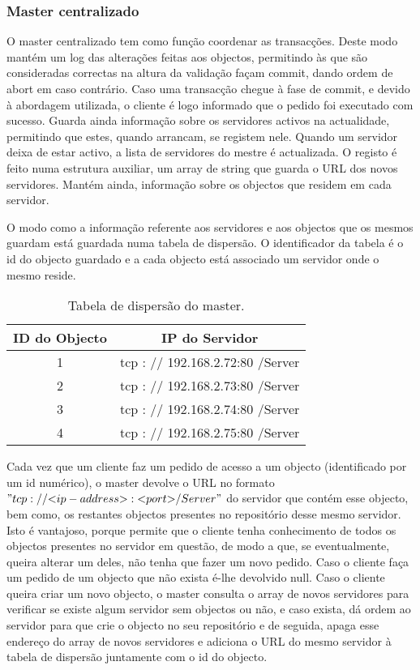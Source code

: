 \subsubsection{Master centralizado}

O master centralizado tem como função coordenar as transacções. Deste modo mantém um log das alterações feitas aos objectos, permitindo às que são consideradas correctas na altura da validação façam commit, dando ordem de abort em caso contrário. Caso uma transacção chegue à fase de commit, e devido à abordagem utilizada, o cliente é logo informado que o pedido foi executado com sucesso. Guarda ainda informação sobre os servidores activos na actualidade, permitindo que estes, quando arrancam, se registem nele. Quando um servidor deixa de estar activo, a lista de servidores do mestre é actualizada. O registo é feito numa estrutura auxiliar, um array de string que guarda o URL dos novos servidores. Mantém ainda, informação sobre os objectos que residem em cada servidor.

O modo como a informação referente aos servidores e aos objectos que os mesmos guardam está guardada numa tabela de dispersão. O identificador da tabela é o id do objecto guardado e a cada objecto está associado um servidor onde o mesmo reside.

\begin{table}
\centering
\begin{tabular}{c|c}
ID do Objecto & IP do Servidor \\\hline
1 & tcp : // 192.168.2.72:80 /Server \\
2 & tcp : // 192.168.2.73:80 /Server \\
3 & tcp : // 192.168.2.74:80 /Server \\
4 & tcp : // 192.168.2.75:80 /Server \\
\end{tabular}
\caption{\label{tab:widgets}Tabela de dispersão do master.}
\end{table}



Cada vez que um cliente faz um pedido de acesso a um objecto (identificado por um id numérico), o master devolve o URL no formato \("tcp : // {<}{ip-address}{>}:{<}{port}{>} /Server"\) do servidor que contém esse objecto, bem como, os restantes objectos presentes no repositório desse mesmo servidor.  Isto é vantajoso, porque permite que o cliente tenha conhecimento de todos os objectos presentes no servidor em questão, de modo a que, se eventualmente, queira alterar um deles, não tenha que fazer um novo pedido. Caso o cliente faça um pedido de um objecto que não exista é-lhe devolvido null. Caso o cliente queira criar um novo objecto, o master consulta o array de novos servidores para verificar se existe algum servidor sem objectos ou não, e caso exista, dá ordem ao servidor para que crie o objecto no seu repositório e de seguida, apaga esse endereço do array de novos servidores e adiciona o URL do mesmo servidor à tabela de dispersão juntamente com o id do objecto. 